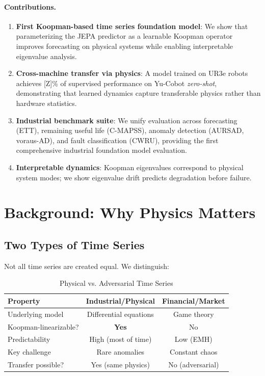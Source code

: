 \documentclass{article}
\begin{document}
\paragraph{Contributions.}
\begin{enumerate}
    \item \textbf{First Koopman-based time series foundation model}: We show that parameterizing the JEPA predictor as a learnable Koopman operator improves forecasting on physical systems while enabling interpretable eigenvalue analysis.

    \item \textbf{Cross-machine transfer via physics}: A model trained on UR3e robots achieves [Z]\% of supervised performance on Yu-Cobot \emph{zero-shot}, demonstrating that learned dynamics capture transferable physics rather than hardware statistics.

    \item \textbf{Industrial benchmark suite}: We unify evaluation across forecasting (ETT), remaining useful life (C-MAPSS), anomaly detection (AURSAD, voraus-AD), and fault classification (CWRU), providing the first comprehensive industrial foundation model evaluation.

    \item \textbf{Interpretable dynamics}: Koopman eigenvalues correspond to physical system modes; we show eigenvalue drift predicts degradation before failure.
\end{enumerate}

\section{Background: Why Physics Matters}

\subsection{Two Types of Time Series}

Not all time series are created equal. We distinguish:

\begin{table}[h]
\centering
\caption{Physical vs. Adversarial Time Series}
\begin{tabular}{lcc}
\toprule
\textbf{Property} & \textbf{Industrial/Physical} & \textbf{Financial/Market} \\
\midrule
Underlying model & Differential equations & Game theory \\
Koopman-linearizable? & \textbf{Yes} & No \\
Predictability & High (most of time) & Low (EMH) \\
Key challenge & Rare anomalies & Constant chaos \\
Transfer possible? & Yes (same physics) & No (adversarial) \\
\bottomrule
\end{tabular}
\end{table}
\end{document}
